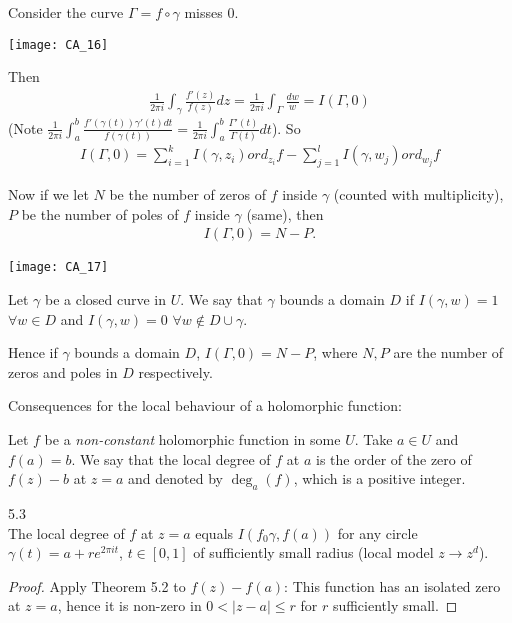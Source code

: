 \documentclass[a4paper]{article}
\begin{document}
\begin{rem}
Consider the curve $\Gamma = f \circ \gamma$ misses $0$. 

\texttt{[image: CA\_16]}

Then
\begin{equation*}
\begin{aligned}
\frac{1}{2\pi i} \int_\gamma \frac{f'(z)}{f(z)} dz = \frac{1}{2\pi i} \int_\Gamma \frac{dw}{w} = I(\Gamma,0)
\end{aligned}
\end{equation*}
(Note $\frac{1}{2\pi i} \int_a^b \frac{f'(\gamma(t))\gamma'(t) dt}{f(\gamma(t))} = \frac{1}{2\pi i}\int_a^b \frac{\Gamma'(t)}{\Gamma(t)} dt$). So
\begin{equation*}
\begin{aligned}
I(\Gamma,0) = \sum_{i=1}^k I(\gamma,z_i) ord_{z_i} f - \sum_{j=1}^l I(\gamma,w_j) ord_{w_j} f
\end{aligned}
\end{equation*}

Now if we let $N$ be the number of zeros of $f$ inside $\gamma$ (counted with multiplicity), $P$ be the number of poles of $f$ inside $\gamma$ (same), then 
\begin{equation*}
\begin{aligned}
I(\Gamma,0) = N-P.
\end{aligned}
\end{equation*}

\texttt{[image: CA\_17]}
\end{rem}

\begin{defi}
Let $\gamma$ be a closed curve in $U$. We say that $\gamma$ bounds a domain $D$ if $I(\gamma,w) = 1$ $\forall w \in D$ and $I(\gamma,w) = 0$ $\forall w \not\in D\cup\gamma$.
\end{defi}

Hence if $\gamma$ bounds a domain $D$, $I(\Gamma,0) = N-P$, where $N,P$ are the number of zeros and poles in $D$ respectively.

Consequences for the local behaviour of a holomorphic function:

Let $f$ be a \emph{non-constant} holomorphic function in some $U$. Take $a \in U$ and $f(a)=b$. We say that the local degree of $f$ at $a$ is the order of the zero of $f(z)-b$ at $z=a$ and denoted by $\deg_a (f)$, which is a positive integer.

\begin{prop} 5.3\\
The local degree of $f$ at $z=a$ equals $I(f_0 \gamma,f(a))$ for any circle $\gamma(t) = a+re^{2\pi it}$, $t \in [0,1]$ of sufficiently small radius (local model $z \to z^d$).
\begin{proof}
Apply Theorem 5.2 to $f(z)-f(a)$: This function has an isolated zero at $z=a$, hence it is non-zero in $0<|z-a|\leq r$ for $r$ sufficiently small.
\end{proof}
\end{prop}
\end{document}
